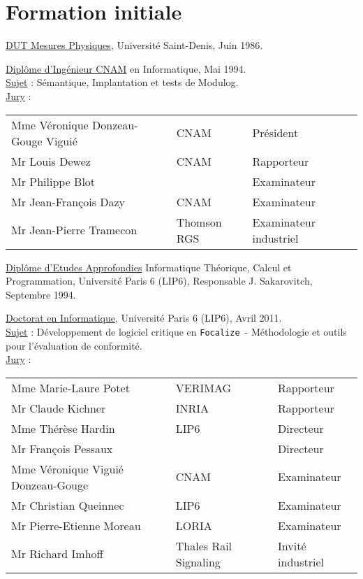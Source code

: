 \documentclass[a4paper,12pt]{article}
\newcommand{\Focal}{{\tt Focalize}}
\newcommand{\smallspace}{\vspace{0.25cm}}
\begin{document}
\newpage
\section{Formation initiale}

\underline{DUT Mesures Physiques}, Universit\'e Saint-Denis, Juin 1986.

\smallspace
\underline{Dipl\^ome d'Ing\'enieur CNAM} en Informatique, Mai 1994.
\\
\underline{Sujet} : S\'emantique, Implantation et tests de Modulog.
\\
\underline{Jury} :
\begin{tabular}{lll}
  Mme V\'eronique Donzeau-Gouge Vigui\'e & CNAM & Pr\'esident  \\
  Mr Louis Dewez & CNAM & Rapporteur \\
  Mr Philippe Blot & & Examinateur \\
  Mr Jean-Fran\c{c}ois Dazy & CNAM & Examinateur \\
  Mr Jean-Pierre Tramecon & Thomson RGS & Examinateur industriel \\
\end{tabular}

\smallspace
\underline{Dipl\^ome d'Etudes Approfondies} Informatique Th\'eorique,
Calcul et Programmation, Universit\'e Paris 6 (LIP6), Responsable
J. Sakarovitch, Septembre 1994.

\smallspace
\underline{Doctorat en Informatique}, Universit\'e Paris 6 (LIP6),
Avril 2011. 
\\
\underline{Sujet} : D\'eveloppement de logiciel critique en \Focal\ -
M\'ethodologie et outils pour l'\'evaluation de conformit\'e.
\\
\underline{Jury} :
\begin{tabular}{lll}
  Mme Marie-Laure Potet & VERIMAG & Rapporteur \\
  Mr Claude Kichner & INRIA & Rapporteur \\
  Mme Th\'er\`ese Hardin & LIP6 & Directeur \\
  Mr Fran\c{c}ois Pessaux & & Directeur \\
  Mme V\'eronique Vigui\'e Donzeau-Gouge & CNAM & Examinateur \\
  Mr Christian Queinnec & LIP6 & Examinateur \\
  Mr Pierre-Etienne Moreau & LORIA & Examinateur \\
  Mr Richard Imhoff & Thales Rail Signaling & Invit\'e industriel\\
\end{tabular}
\end{document}
